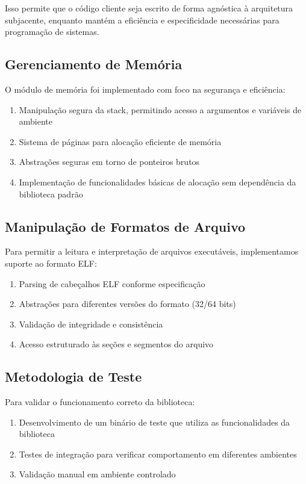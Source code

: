 \documentclass[12pt,a4paper]{article}
\begin{document}
Isso permite que o código cliente seja escrito de forma agnóstica à arquitetura subjacente, enquanto mantém a eficiência e especificidade necessárias para programação de sistemas.

\subsection{Gerenciamento de Memória}

O módulo de memória foi implementado com foco na segurança e eficiência:

\begin{enumerate}
    \item Manipulação segura da stack, permitindo acesso a argumentos e variáveis de ambiente
    \item Sistema de páginas para alocação eficiente de memória
    \item Abstrações seguras em torno de ponteiros brutos
    \item Implementação de funcionalidades básicas de alocação sem dependência da biblioteca padrão
\end{enumerate}

\subsection{Manipulação de Formatos de Arquivo}

Para permitir a leitura e interpretação de arquivos executáveis, implementamos suporte ao formato ELF:

\begin{enumerate}
    \item Parsing de cabeçalhos ELF conforme especificação
    \item Abstrações para diferentes versões do formato (32/64 bits)
    \item Validação de integridade e consistência
    \item Acesso estruturado às seções e segmentos do arquivo
\end{enumerate}

\subsection{Metodologia de Teste}

Para validar o funcionamento correto da biblioteca:

\begin{enumerate}
    \item Desenvolvimento de um binário de teste que utiliza as funcionalidades da biblioteca
    \item Testes de integração para verificar comportamento em diferentes ambientes
    \item Validação manual em ambiente controlado
\end{enumerate}
\end{document}
